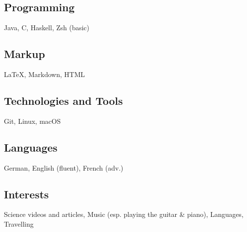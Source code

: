 \documentclass[]{jonas-cv}
\begin{document}
\begin{minipage}[t]{0.34\textwidth}
\tinysectionsep
\subsection{Programming}
Java, C, Haskell, Zsh (basic)\\
\sectionsep

\subsection{Markup}
\LaTeX, Markdown, HTML\\
\sectionsep

\subsection{Technologies and Tools}
Git, Linux, macOS\\
\sectionsep

\subsection{Languages}
German, English (fluent), French (adv.)
\sectionsep
\subsection{Interests}
Science videos and articles, Music (esp. playing the guitar \& piano), Languages, Travelling

%
%

\end{minipage} 
\hfill
\end{document}
